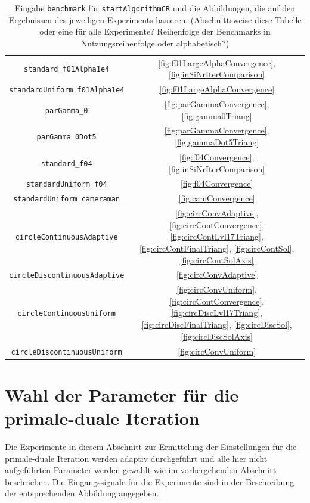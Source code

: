 \begin{table}
\begin{tabular}{c|c}
    \texttt{standard\_f01Alpha1e4} &
    \ref{fig:f01LargeAlphaConvergence}, \ref{fig:inSiNrIterComparison}\\
    \texttt{standardUniform\_f01Alpha1e4} &
    \ref{fig:f01LargeAlphaConvergence}\\
    \texttt{parGamma\_0} &
    \ref{fig:parGammaConvergence}, \ref{fig:gamma0Triang}\\
    \texttt{parGamma\_0Dot5} &
    \ref{fig:parGammaConvergence}, \ref{fig:gammaDot5Triang}\\
    \texttt{standard\_f04} &
    \ref{fig:f04Convergence}, \ref{fig:inSiNrIterComparison}\\
    \texttt{standardUniform\_f04} &
    \ref{fig:f04Convergence}\\
    \texttt{standardUniform\_cameraman} &
    \ref{fig:camConvergence}\\
    \texttt{circleContinuousAdaptive} &
    \ref{fig:circConvAdaptive}, \ref{fig:circContConvergence},
    \ref{fig:circContLvl17Triang}, \ref{fig:circContFinalTriang},
    \ref{fig:circContSol}, \ref{fig:circContSolAxis}\\
    \texttt{circleDiscontinuousAdaptive} &
    \ref{fig:circConvAdaptive}\\
    \texttt{circleContinuousUniform} &
    \ref{fig:circConvUniform}, \ref{fig:circContConvergence},
    \ref{fig:circDiscLvl17Triang}, \ref{fig:circDiscFinalTriang},
    \ref{fig:circDiscSol}, \ref{fig:circDiscSolAxis}\\
    \texttt{circleDiscontinuousUniform} &
    \ref{fig:circConvUniform}\\
    \hline
  \end{tabular}
  \caption{Eingabe \texttt{benchmark} für \texttt{startAlgorithmCR} und die
  Abbildungen, die auf den Ergebnissen des jeweiligen Experiments basieren. 
  (Abschnittsweise diese Tabelle oder eine für alle Experimente? Reihenfolge
  der Benchmarks in Nutzungsreihenfolge oder alphabetisch?)}
  \label{tab:usedBenchmarks}
\end{table} 


\section{Wahl der Parameter für die primale-duale Iteration}
\label{sec:choiceOfParameters}

Die Experimente in diesem Abschnitt zur Ermittelung der Einstellungen
für die primale-duale Iteration werden adaptiv durchgeführt und alle hier
nicht aufgeführten Parameter werden gewählt wie im vorhergehenden Abschnitt
beschrieben.
Die Eingangssignale für die Experimente sind in der Beschreibung der 
entsprechenden Abbildung angegeben.

